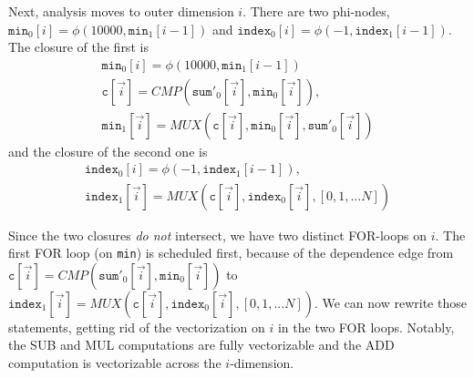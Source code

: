\documentclass[sigconf, screen, natbib=false, dvipsnames, table]{acmart}
\theoremstyle{definition}
\begin{document}
Next, analysis moves to outer dimension $i$. There are two phi-nodes, $\texttt{min}_0[i] = \phi(10000,\texttt{min}_1[i-1])$ and $\texttt{index}_0[i] = \phi(-1,\texttt{index}_1[i-1])$.
The closure of the first is
\[
\begin{array}{l}
\texttt{min}_0[i] = \phi(10000,\texttt{min}_1[i-1]) \\
\texttt{c}[\stackrel{\rightarrow}{i}] = \mathit{CMP}(\texttt{sum}'_0[\stackrel{\rightarrow}{i}],\texttt{min}_0[\stackrel{\rightarrow}{i}]), \\
\texttt{min}_1[\stackrel{\rightarrow}{i}] = \mathit{MUX}(\texttt{c}[\stackrel{\rightarrow}{i}],\texttt{min}_0[\stackrel{\rightarrow}{i}],\texttt{sum}'_0[\stackrel{\rightarrow}{i}])
\end{array}
\]
and the closure of the second one is
\[
\begin{array}{l}
\texttt{index}_0[i] = \phi(-1,\texttt{index}_1[i-1]), \\
\texttt{index}_1[\stackrel{\rightarrow}{i}] = \mathit{MUX}(\texttt{c}[\stackrel{\rightarrow}{i}],\texttt{index}_0[\stackrel{\rightarrow}{i}],[0,1,...N])
\end{array}
\]

Since the two closures \emph{do not} intersect, we have two distinct FOR-loops on $i$. The first FOR loop (on \texttt{min}) is scheduled first, because of the dependence edge from $\texttt{c}[\stackrel{\rightarrow}{i}] = \mathit{CMP}(\texttt{sum}'_0[\stackrel{\rightarrow}{i}],\texttt{min}_0[\stackrel{\rightarrow}{i}])$ to
$\texttt{index}_1[\stackrel{\rightarrow}{i}] = \mathit{MUX}(\texttt{c}[\stackrel{\rightarrow}{i}],\texttt{index}_0[\stackrel{\rightarrow}{i}],[0,1,...N])$. We can now rewrite those statements, getting rid of the vectorization on $i$ in the two FOR loops. Notably, the SUB and MUL computations are fully vectorizable and the ADD computation is vectorizable across the $i$-dimension.
\end{document}
